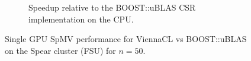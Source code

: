 \begin{figure}
\begin{subfigure}[t]{0.48\textwidth}
\caption{Speedup relative to the BOOST::uBLAS CSR implementation on the CPU.}
\label{fig:spear_vcl_speedup}
\end{subfigure} 
\caption{Single GPU SpMV performance for ViennaCL vs BOOST::uBLAS on the Spear cluster (FSU) for $n=50$. }
\end{figure}




%    

%
%

